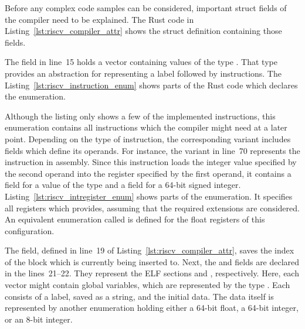 Before any complex code samples can be considered, important struct fields of the compiler need to be explained.
The Rust code in Listing~\ref{lst:riscv_compiler_attr} shows the  struct definition containing those fields.


The  field in line~15 holds a vector containing values of the type .
That type provides an abstraction for representing a label followed by instructions.
The Listing~\ref{lst:riscv_instruction_enum} shows parts of the Rust code which declares the  enumeration.


Although the listing only shows a few of the implemented instructions,
this enumeration contains all instructions which the compiler might need at a later point.
Depending on the type of instruction, the corresponding variant includes fields which define its operands.
For instance, the  variant in line~70 represents the  instruction in assembly.
Since this instruction loads the integer value specified by the second operand into the register specified by the first operand,
it contains a field for a value of the type  and a field for a 64-bit signed integer.
Listing~\ref{lst:riscv_intregister_enum} shows parts of the  enumeration.
It specifies all registers which \riscv{} provides, assuming that the required extensions are considered.
An equivalent enumeration called  is defined for the float registers of this \riscv{} configuration.


The  field, defined in line~19 of Listing~\ref{lst:riscv_compiler_attr},
saves the index of the block which is currently being inserted to.
Next, the  and  fields are declared in the lines~21--22.
They represent the ELF sections  and , respectively.
Here, each vector might contain global variables, which are represented by the type .
Each  consists of a label, saved as a string, and the initial data.
The data itself is represented by another enumeration holding either a 64-bit float, a 64-bit integer, or an 8-bit integer.

